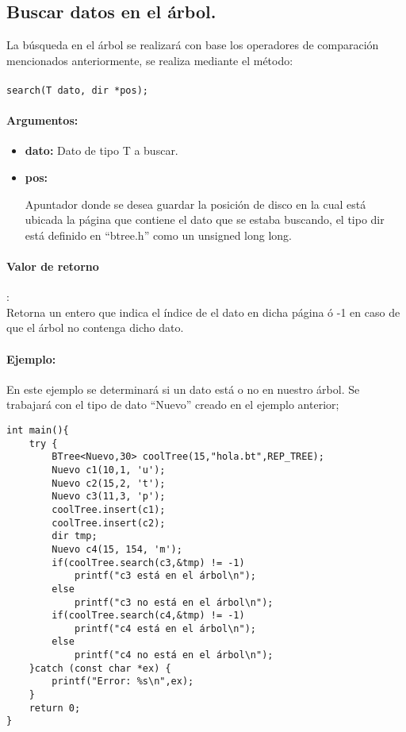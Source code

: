 \documentclass{book}
\begin{document}
\subsection{Buscar datos en el árbol.}
La búsqueda en el árbol se realizará con base los operadores de comparación mencionados anteriormente, se realiza mediante el método:\\\\

 \verb+search(T dato, dir *pos);+

\paragraph{Argumentos:}

\begin{itemize}
\item{\bf dato:}
Dato de tipo T a buscar.

\item {\bf pos:}

Apuntador donde se desea guardar la posición de disco en la cual está ubicada la página que contiene el dato que se estaba buscando, el tipo dir está definido en ``btree.h'' como un unsigned long long.

\end{itemize}

\paragraph{Valor de retorno}:\\

Retorna un entero que indica el índice de el dato en dicha página ó -1 en caso de que el árbol no contenga dicho dato.


\paragraph{Ejemplo:}
En este ejemplo se determinará si un dato está o no en nuestro árbol. Se trabajará con el tipo de dato ``Nuevo'' creado en el ejemplo anterior;

\begin{verbatim}
int main(){
    try {
        BTree<Nuevo,30> coolTree(15,"hola.bt",REP_TREE);
        Nuevo c1(10,1, 'u');
        Nuevo c2(15,2, 't');
        Nuevo c3(11,3, 'p');
        coolTree.insert(c1);
        coolTree.insert(c2);
        dir tmp;
        Nuevo c4(15, 154, 'm');
        if(coolTree.search(c3,&tmp) != -1)
            printf("c3 está en el árbol\n");
        else
            printf("c3 no está en el árbol\n");
        if(coolTree.search(c4,&tmp) != -1)
            printf("c4 está en el árbol\n");
        else
            printf("c4 no está en el árbol\n");
    }catch (const char *ex) {
        printf("Error: %s\n",ex);
    }
    return 0;
}
\end{verbatim}
\end{document}
